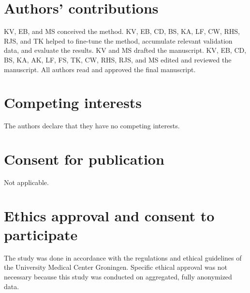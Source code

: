 \section*{Authors’ contributions}
KV, EB, and MS conceived the method.
KV, EB, CD, BS, KA, LF, CW, RHS, RJS, and TK helped to fine-tune the method, accumulate relevant validation data, and evaluate the results.
KV and MS drafted the manuscript.
KV, EB, CD, BS, KA, AK, LF, FS, TK, CW, RHS, RJS, and MS edited and reviewed the manuscript.
All authors read and approved the final manuscript.

\section*{Competing interests}
The authors declare that they have no competing interests.

\section*{Consent for publication}
Not applicable.

\section*{Ethics approval and consent to participate}
The study was done in accordance with the regulations and ethical guidelines of the University Medical Center Groningen.
Specific ethical approval was not necessary because this study was conducted on aggregated, fully anonymized data.
